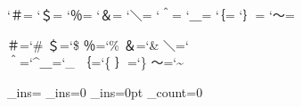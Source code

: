 \def\ninePoint{\set_styles{ix}%
  \set_families{ix}{vi}{v}%
  \set_line_sizes{12pt}{0pt}{0pt}%
  \macro{\the\font_style}}

\def\tenPoint{\set_styles{x}%
  \set_families{x}{vii}{v}%
  \set_line_sizes{13pt}{0pt}{0pt}%
  \macro{\the\font_style}}

\def\twelvePoint{\set_styles{xii}%
  \set_families{xii}{ix}{vi}%
  \set_line_sizes{15pt}{0pt}{0pt}%
  \macro{\the\font_style}}

\def\fourteenPoint{\set_styles{xiv}%
  \set_families{xiv}{x}{vii}%
  \set_line_sizes{18pt}{0pt}{0pt}%
  \macro{\the\font_style}}

\def\seventeenPoint{\set_styles{xvii}%
  \set_families{xvii}{xii}{ix}%
  \set_line_sizes{21pt}{0pt}{0pt}%
  \macro{\the\font_style}}


\catcode`＃=\active
\catcode`＄=\active
\catcode`％=\active
\catcode`＆=\active
\catcode`＼=\active
\catcode`＾=\active
\catcode`＿=\active
\catcode`｛=\active
\catcode`｝=\active
\catcode`～=\active

\chardef＃=`\#
\chardef＄=`\$
\chardef％=`\%
\chardef＆=`\&
\chardef＼=`\\
\chardef＾=`\^
\chardef＿=`\_
\chardef｛=`\{
\chardef｝=`\}
\chardef～=`\~

\def\proofMode{\proof_modetrue}
\def\finalMode{\proof_modefalse}
\def\cleanPage{\footline={}%
  \def\makeheadline{\vbox to 0pt{\skip0=\topskip
      \advance\skip0 by -2.75\baselineskip \vskip\skip0
      \hbox to \hsize{\hfill}\vss}%
    \nointerlineskip}}

\dimen\margin_ins=\maxdimen
\count\margin_ins=0 \skip\margin_ins=0pt %
_count=0

\def\put_insert#1{%
  \_let\_ins{#1_ins}\_let\_left{#1_left}\_let\_box{#1_box}%
  \ifdim\ht\_ins>0pt
    \global\advance\_left by -\bigskipamount
    \global\advance\_left by -\ht\_ins
    \global\advance\_left by -\dp\_ins
    \unvbox\_ins
    \bigskip
  \fi}

